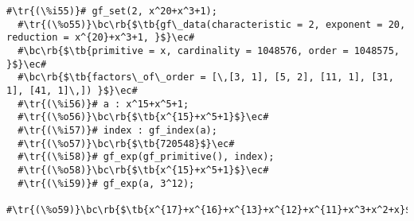 \documentclass[a4paper,11pt,leqno,fleqn]{artikel3}
\newcommand{\bc}{\begin{center}}
\newcommand{\ec}{\end{center}}
\newcommand{\tr}[1]{\textcolor{red}{#1}}
\newcommand{\tb}[1]{\textcolor{blue}{#1}}
\newcommand{\rb}[1]{\raisebox{2mm}[0mm][1mm]{#1}}
\begin{document}
\vspace*{2mm}
\begin{lstlisting}[escapechar=\#]
  #\tr{(\%i55)}# gf_set(2, x^20+x^3+1);
  #\tr{(\%o55)}\bc\rb{$\tb{gf\_data(characteristic = 2, exponent = 20, reduction = x^{20}+x^3+1, }$}\ec#
  #\bc\rb{$\tb{primitive = x, cardinality = 1048576, order = 1048575, }$}\ec#
  #\bc\rb{$\tb{factors\_of\_order = [\,[3, 1], [5, 2], [11, 1], [31, 1], [41, 1]\,]) }$}\ec#
  #\tr{(\%i56)}# a : x^15+x^5+1;
  #\tr{(\%o56)}\bc\rb{$\tb{x^{15}+x^5+1}$}\ec#
  #\tr{(\%i57)}# index : gf_index(a);
  #\tr{(\%o57)}\bc\rb{$\tb{720548}$}\ec#
  #\tr{(\%i58)}# gf_exp(gf_primitive(), index);
  #\tr{(\%o58)}\bc\rb{$\tb{x^{15}+x^5+1}$}\ec#
  #\tr{(\%i59)}# gf_exp(a, 3^12);
  #\tr{(\%o59)}\bc\rb{$\tb{x^{17}+x^{16}+x^{13}+x^{12}+x^{11}+x^3+x^2+x}$}\ec#
\end{lstlisting}
\end{document}
